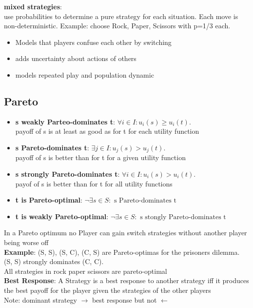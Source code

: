 \documentclass[12pt,a4paper]{article}
\begin{document}
\textbf{mixed strategies}:\\
use probabilities to determine a pure strategy for each situation. Each move is non-deterministic. Example: choose Rock, Paper, Scissors with p=1/3 each. \\
\begin{itemize}
\setlength\itemsep{0.05cm}
\item Models that players confuse each other by switching
\item adds uncertainty about actions of others
\item models repeated play and population dynamic
\end{itemize}


\subsection{Pareto}
\begin{itemize}
\setlength\itemsep{0.05cm}
\item \textbf{s weakly Parteo-dominates t}: $\forall i\in I: u_i(s) \geq u_i(t)$. \\
payoff of s is at least as good as for t for each utility function
\item \textbf{s Pareto-dominates t}: $\exists j \in I: u_j(s) > u_j(t)$.\\
payoff of s is better than for t for a given utility function\\
\item \textbf{s strongly Pareto-dominates t}: $\forall i \in I: u_i(s) > u_i(t)$.\\
payof of s is better than for t for all utility functions
\item \textbf{t is Pareto-optimal}: $\neg \exists s\in S: \text{ s Pareto-dominates t}$\\
\item \textbf{t is weakly Pareto-optimal}: $\neg \exists s\in S: \text{ s stongly Pareto-dominates t}$
\end{itemize}

In a Pareto optimum no Player can gain switch strategies without another player being worse off
\\
\textbf{Example}: (S, S), (S, C), (C, S) are Pareto-optimas for the prisoners dilemma.\\
(S, S) strongly dominates (C, C).\\
All strategies in rock paper scissors are pareto-optimal
\\
\textbf{Best Response}: A Strategy is a best response to another strategy iff it produces the best payoff for the player given the strategies of the other players
\\
Note: dominant strategy $\rightarrow$ best response but not $\leftarrow$
\end{document}
